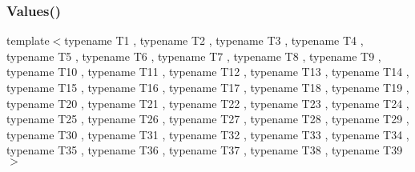 \mbox{\label{namespacetesting_aba3a6a2dcb9660c6ccb1d867c7a137ee}} 
\subsubsection{\texorpdfstring{Values()}{Values()}\hspace{0.1cm}{\footnotesize\ttfamily [40/51]}}
{\footnotesize\ttfamily template$<$typename T1 , typename T2 , typename T3 , typename T4 , typename T5 , typename T6 , typename T7 , typename T8 , typename T9 , typename T10 , typename T11 , typename T12 , typename T13 , typename T14 , typename T15 , typename T16 , typename T17 , typename T18 , typename T19 , typename T20 , typename T21 , typename T22 , typename T23 , typename T24 , typename T25 , typename T26 , typename T27 , typename T28 , typename T29 , typename T30 , typename T31 , typename T32 , typename T33 , typename T34 , typename T35 , typename T36 , typename T37 , typename T38 , typename T39 $>$ \\
}
